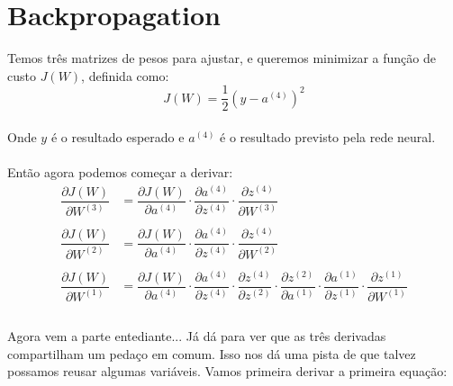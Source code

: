 \documentclass[10pt, a4paper]{article}
\begin{document}
\section{Backpropagation}
Temos três matrizes de pesos para ajustar, e queremos minimizar a função de custo $J(W)$, definida como:
\\
\begin{equation}\nonumber
J(W) = \frac{1}{2}(y - a^{(4)})^2
\end{equation}
\\
Onde $y$ é o resultado esperado e $a^{(4)}$ é o resultado previsto pela rede neural.
\\\\
Então agora podemos começar a derivar:
\\
\begin{align*} \nonumber
\dfrac{\partial J(W)}{\partial W^{(3)}} &= \dfrac{\partial J(W)}{\partial a^{(4)}} \cdot \dfrac{\partial a^{(4)}}{\partial z^{(4)}} \cdot \dfrac{\partial z^{(4)}}{\partial W^{(3)}} \\
\\
\dfrac{\partial J(W)}{\partial W^{(2)}} &= \dfrac{\partial J(W)}{\partial a^{(4)}} \cdot \dfrac{\partial a^{(4)}}{\partial z^{(4)}} \cdot \dfrac{\partial z^{(4)}}{\partial W^{(2)}} \\
\\
\dfrac{\partial J(W)}{\partial W^{(1)}} &= \dfrac{\partial J(W)}{\partial a^{(4)}} \cdot \dfrac{\partial a^{(4)}}{\partial z^{(4)}} \cdot \dfrac{\partial z^{(4)}}{\partial z^{(2)}} \cdot \dfrac{\partial z^{(2)}}{\partial a^{(1)}} \cdot \dfrac{\partial a^{(1)}}{\partial z^{(1)}} \cdot \dfrac{\partial z^{(1)}}{\partial W^{(1)}} \\\\
\end{align*}

Agora vem a parte entediante... Já dá para ver que as três derivadas compartilham um pedaço em comum. Isso nos dá uma pista de que talvez possamos reusar algumas variáveis. Vamos primeira derivar a primeira equação:
\end{document}

